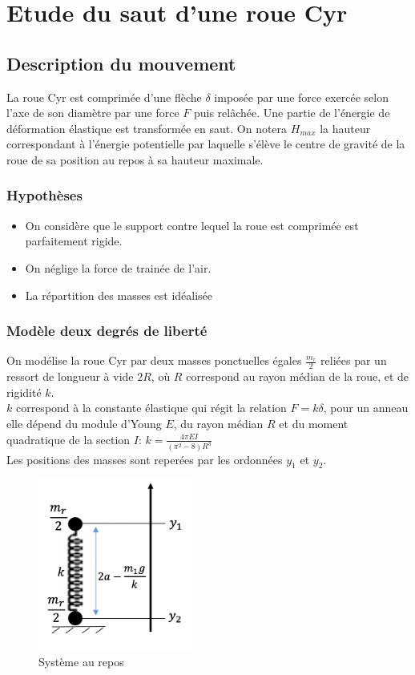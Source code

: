 \section{Etude du saut d'une roue Cyr}
\subsection{Description du mouvement}
La roue Cyr est comprimée d'une flèche $\delta$ imposée par une force exercée selon l'axe de son diamètre par une force $F$ puis relâchée. Une partie de l'énergie de déformation élastique est transformée en saut. On notera $H_{max}$ la hauteur correspondant à l'énergie potentielle par laquelle s'élève le centre de gravité de la roue de sa position au repos à sa hauteur maximale.


\subsubsection{Hypothèses}
\begin{itemize}
    \item On considère que le support contre lequel la roue est comprimée est parfaitement rigide.
    \item On néglige la force de trainée de l'air.
    \item La répartition des masses est idéalisée
\end{itemize}

\subsubsection{Modèle deux degrés de liberté}
On modélise la roue Cyr par deux masses ponctuelles égales $\frac{m_r}{2}$ reliées par un ressort de longueur à vide $2R$, où $R$ correspond au rayon médian de la roue, et de rigidité $k$. \\
$k$ correspond à la constante élastique qui régit la relation $F=k \delta$, pour un anneau elle dépend du module d'Young $E$, du rayon médian $R$ et du moment quadratique de la section $I$: $k=\frac{4\pi EI}{(\pi^2 -8)R^3}$ \cite{yangkim}
\\
 Les positions des masses sont reperées par les ordonnées $y_1$ et $y_2$.

\begin{figure}[htb]
\centering
\includegraphics[width=2in]{images_2ddl/repos.png}
\caption{Système au repos}
\label{fig:repos}
\end{figure}

